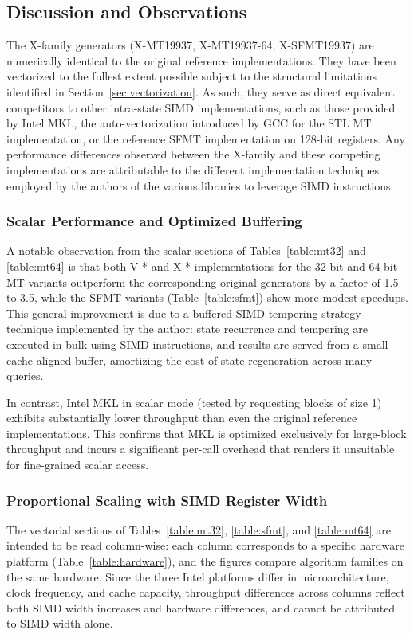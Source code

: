 \documentclass[preprint,1p,times]{elsarticle}
\begin{document}
\subsection{Discussion and Observations}
\label{sec:obs}

The X-family generators (X-MT19937, X-MT19937-64, X-SFMT19937) are numerically identical to the original reference implementations. They have been vectorized to the fullest extent possible subject to the structural limitations identified in Section~\ref{sec:vectorization}. As such, they serve as direct equivalent competitors to other intra-state SIMD implementations, such as those provided by Intel MKL, the auto-vectorization introduced by GCC for the STL MT implementation, or the reference SFMT implementation on 128-bit registers. Any performance differences observed between the X-family and these competing implementations are attributable to the different implementation techniques employed by the authors of the various libraries to leverage SIMD instructions.

\subsubsection{Scalar Performance and Optimized Buffering}
A notable observation from the scalar sections of Tables~\ref{table:mt32} and \ref{table:mt64} is that both V-* and X-* implementations for the 32-bit and 64-bit MT variants outperform the corresponding original generators by a factor of 1.5 to 3.5, while the SFMT variants (Table~\ref{table:sfmt}) show more modest speedups. This general improvement is due to a buffered SIMD tempering strategy technique implemented by the author: state recurrence and tempering are executed in bulk using SIMD instructions, and results are served from a small cache-aligned buffer, amortizing the cost of state regeneration across many queries.

In contrast, Intel MKL in scalar mode (tested by requesting blocks of size 1) exhibits substantially lower throughput than even the original reference implementations. This confirms that MKL is optimized exclusively for large-block throughput and incurs a significant per-call overhead that renders it unsuitable for fine-grained scalar access.

\subsubsection{Proportional Scaling with SIMD Register Width}
\label{sec:scaling}
The vectorial sections of Tables~\ref{table:mt32}, \ref{table:sfmt}, and \ref{table:mt64} are intended to be read column-wise: each column corresponds to a specific hardware platform (Table~\ref{table:hardware}), and the figures compare algorithm families on the same hardware. Since the three Intel platforms differ in microarchitecture, clock frequency, and cache capacity, throughput differences across columns reflect both SIMD width increases and hardware differences, and cannot be attributed to SIMD width alone.
\end{document}
